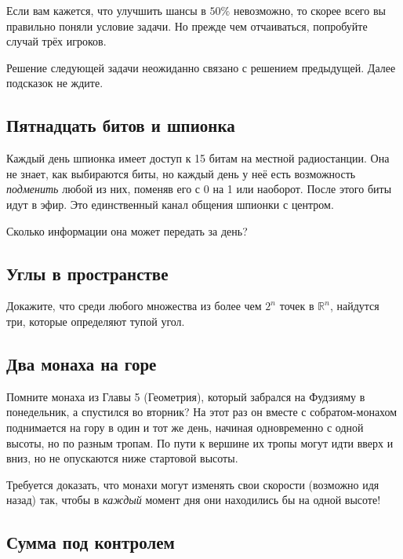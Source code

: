 Если вам кажется, что улучшить шансы в $50\%$ невозможно, то скорее всего вы правильно поняли условие задачи.
Но прежде чем отчаиваться, попробуйте случай трёх игроков.

\medskip 

Решение следующей задачи неожиданно связано с решением предыдущей.
Далее подсказок не ждите.

\subsection*{Пятнадцать битов и шпионка}

Каждый день шпионка имеет доступ к 15 битам на местной радиостанции.
Она не знает, как выбираются биты, но каждый день у неё есть возможность \emph{подменить} любой из них, поменяв его с 0 на 1 или наоборот.
После этого биты идут в эфир. 
Это единственный канал общения шпионки с центром.

Сколько информации она может передать за день?

\subsection*{Углы в пространстве}

Докажите, что среди любого множества из более чем $2^n$ точек в $\mathbb{R}^n$, найдутся три, которые определяют тупой угол.

\subsection*{Два монаха на горе}

Помните монаха из Главы 5 (Геометрия), который забрался на Фудзияму в понедельник, а спустился во вторник?
На этот раз он вместе с собратом-монахом поднимается на гору в один и тот же день, начиная одновременно с одной высоты, но по разным тропам.
По пути к вершине их тропы могут идти вверх и вниз, но не опускаются ниже стартовой высоты.

Требуется доказать, что монахи могут изменять свои скорости (возможно идя назад) так, чтобы в \emph{каждый} момент дня они находились бы на одной высоте!

\subsection*{Сумма под контролем}


